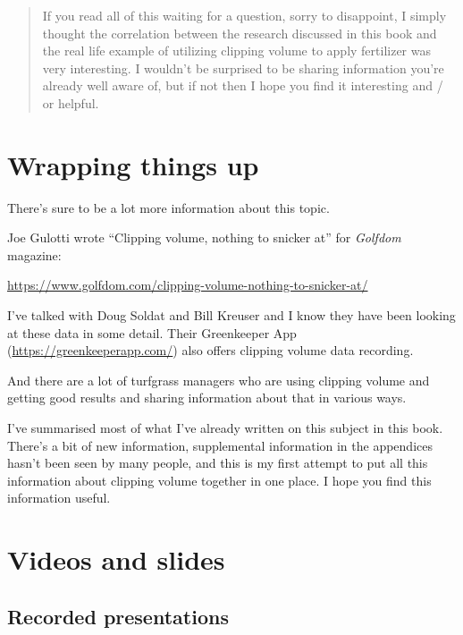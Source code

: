 \documentclass[12pt,b5,]{tufte-book}
\begin{document}
\begin{quote}
If you read all of this waiting for a question, sorry to disappoint, I simply thought the correlation between the research discussed in this book and the real life example of utilizing clipping volume to apply fertilizer was very interesting. I wouldn't be surprised to be sharing information you're already well aware of, but if not then I hope you find it interesting and / or helpful.
\end{quote}

\hypertarget{wrapping-things-up}{%
\chapter{Wrapping things up}\label{wrapping-things-up}}

There's sure to be a lot more information about this topic.

Joe Gulotti wrote ``Clipping volume, nothing to snicker at'' for \emph{Golfdom} magazine:

\url{https://www.golfdom.com/clipping-volume-nothing-to-snicker-at/}

I've talked with Doug Soldat and Bill Kreuser and I know they have been looking at these data in some detail. Their Greenkeeper App (\url{https://greenkeeperapp.com/}) also offers clipping volume data recording.

And there are a lot of turfgrass managers who are using clipping volume and getting good results and sharing information about that in various ways.

I've summarised most of what I've already written on this subject in this book. There's a bit of new information, supplemental information in the appendices hasn't been seen by many people, and this is my first attempt to put all this information about clipping volume together in one place. I hope you find this information useful.

\hypertarget{appendix-appendix}{%
\appendix}


\hypertarget{videos-and-slides}{%
\chapter{Videos and slides}\label{videos-and-slides}}

\hypertarget{recorded-presentations}{%
\section{Recorded presentations}\label{recorded-presentations}}
\end{document}
